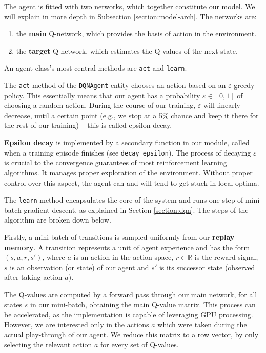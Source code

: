 The agent is fitted with two networks, which together constitute our model. We will explain in more depth in Subsection \ref{section:model-arch}. The networks are:
\begin{enumerate}
    \item the \textbf{main} Q-network, which provides the basis of action in the environment.
    \item the \textbf{target} Q-network, which estimates the Q-values of the next state.
\end{enumerate}

An agent class’s most central methods are \texttt{act} and \texttt{learn}.

The \texttt{act} method of the \texttt{DQNAgent} entity chooses an action based on an $\varepsilon$-greedy policy.
This essentially means that our agent has a probability $\varepsilon \in [0, 1]$ of choosing a random action.
During the course of our training, $\varepsilon$ will linearly decrease, until a certain point (e.g., we stop at a 5\% chance and keep it there for the rest of our training) -- this is called epsilon decay.

\textbf{Epsilon decay} is implemented by a secondary function in our module, called when a training episode finishes (see \verb|decay_epsilon|).
The process of decaying $\varepsilon$ is crucial to the convergence guarantees of most reinforcement learning algorithms.
It manages proper exploration of the environment.
Without proper control over this aspect, the agent can and will tend to get stuck in local optima.

The \verb|learn| method encapsulates the core of the system and runs one step of mini-batch gradient descent, as explained in Section \ref{section:dqn}.
The steps of the algorithm are broken down below.

Firstly, a mini-batch of transitions is sampled uniformly from our \textbf{replay memory}.
A transition represents a unit of agent experience and has the form $(s, a, r, s')$, where $a$ is an action in the action space, $r \in \mathbb{R}$ is the reward signal, $s$ is an observation (or state) of our agent and $s'$ is its successor state (observed after taking action $a$).

The Q-values are computed by a forward pass through our main network, for all states $s$ in our mini-batch, obtaining the main Q-value matrix.
This process can be accelerated, as the implementation is capable of leveraging GPU processing.
However, we are interested only in the actions $a$ which were taken during the actual play-through of our agent.
We reduce this matrix to a row vector, by only selecting the relevant action $a$ for every set of Q-values.

